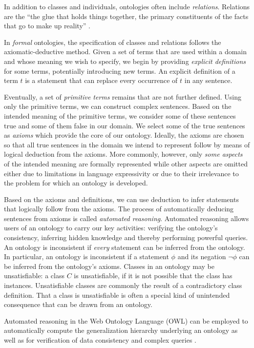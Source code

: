 \documentclass{bioinfo}
\renewcommand{\cite}{\citep}
\begin{document}
In addition to classes and individuals, ontologies often include {\em
  relations}. Relations are the ``the glue that holds things together,
the primary constituents of the facts that go to make up reality''
\cite{}.

In {\em formal} ontologies, the specification of classes and relations
follows the axiomatic-deductive method. Given a set of terms that are
used within a domain and whose meaning we wish to specify, we begin by
providing {\em explicit definitions} for some terms, potentially
introducing new terms. An explicit definition of a term $t$ is a
statement that can replace every occurrence of $t$ in any sentence.

Eventually, a set of {\em primitive terms} remains that are not
further defined. Using only the primitive terms, we can construct
complex sentences. Based on the intended meaning of the primitive
terms, we consider some of these sentences true and some of them false
in our domain. We select some of the true sentences as {\em axioms}
which provide the core of our ontology. Ideally, the axioms are chosen
so that all true sentences in the domain we intend to represent follow
by means of logical deduction from the axioms. More commonly, however,
only {\em some aspects} of the intended meaning are formally
represented while other aspects are omitted either due to limitations
in language expressivity or due to their irrelevance to the problem
for which an ontology is developed.

Based on the axioms and definitions, we can use deduction to infer
statements that logically follow from the axioms.  The process of
automatically deducing sentences from axioms is called {\em automated
  reasoning}. Automated reasoning allows users of an ontology to carry
our key activities: verifying the ontology's consistency, inferring
hidden knowledge and thereby performing powerful queries.  An ontology
is inconsistent if {\em every} statement can be inferred from the
ontology. In particular, an ontology is inconsistent if a statement
$\phi$ and its negation $\neg \phi$ can be inferred from the
ontology's axioms. Classes in an ontology may be unsatisfiable: a
class $C$ is unsatisfiable, if it is not possible that the class has
instances. Unsatisfiable classes are commonly the result of a
contradictory class definition. That a class is unsatisfiable is often
a special kind of unintended consequence that can be drawn from an
ontology.

Automated reasoning in the Web Ontology Language (OWL) can be employed
to automatically compute the generalization hierarchy underlying an
ontology as well as for verification of data consistency and complex
queries \cite{Hoehndorf2011incon, Hoehndorf2011models}.
\end{document}
